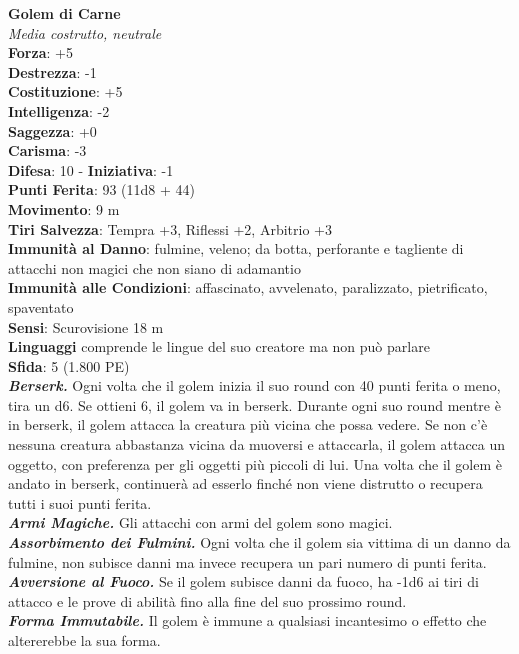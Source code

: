 \begin{multicols}{2}
\medskip\textbf{Golem di Carne}\\
\emph{Media costrutto, neutrale}\\
\textbf{Forza}: +5\\
\textbf{Destrezza}: -1\\
\textbf{Costituzione}: +5\\
\textbf{Intelligenza}: -2\\
\textbf{Saggezza}: +0\\
\textbf{Carisma}: -3\\
\textbf{Difesa}: 10 - \textbf{Iniziativa}: -1\\
\textbf{Punti Ferita}: 93 (11d8 + 44)\\
\textbf{Movimento}: 9 m\\
\textbf{Tiri Salvezza}: Tempra +3, Riflessi +2, Arbitrio +3\\
\textbf{Immunità al Danno}: fulmine, veleno; da botta, perforante e tagliente di attacchi non magici che non siano di adamantio\\
\textbf{Immunità alle Condizioni}: affascinato, avvelenato, paralizzato, pietrificato, spaventato\\
\textbf{Sensi}: Scurovisione 18 m\\
\textbf{Linguaggi} comprende le lingue del suo creatore ma non può parlare\\
\textbf{Sfida}: 5 (1.800 PE)\smallskip\\
\emph{\textbf{Berserk.}} Ogni volta che il golem inizia il suo round con 40 punti ferita o meno, tira un d6. Se ottieni 6, il golem va in berserk. Durante ogni suo round mentre è in berserk, il golem attacca la creatura più vicina che possa vedere. Se non c'è nessuna creatura abbastanza vicina da muoversi e attaccarla, il golem attacca un oggetto, con preferenza per gli oggetti più piccoli di lui. Una volta che il golem è andato in berserk, continuerà ad esserlo finché non viene distrutto o recupera tutti i suoi punti ferita.\\
\emph{\textbf{Armi Magiche.}} Gli attacchi con armi del golem sono magici.\\
\emph{\textbf{Assorbimento dei Fulmini.}} Ogni volta che il golem sia vittima di un danno da fulmine, non subisce danni ma invece recupera un pari numero di punti ferita.\\
\emph{\textbf{Avversione al Fuoco.}} Se il golem subisce danni da fuoco, ha -1d6 ai tiri di attacco e le prove di abilità fino alla fine del suo prossimo round.\\
\emph{\textbf{Forma Immutabile.}} Il golem è immune a qualsiasi incantesimo o effetto che altererebbe la sua forma.\\

\end{multicols}
